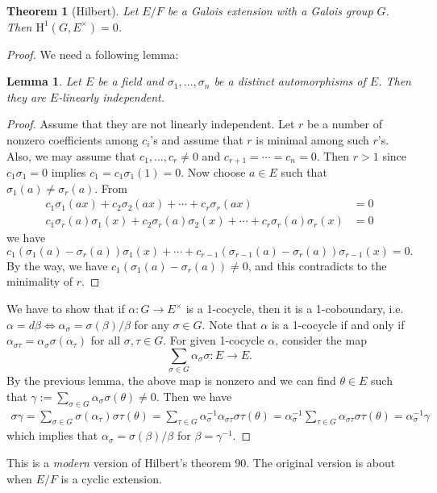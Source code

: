 \documentclass{article}
\newtheorem{theorem}{Theorem}
\newtheorem{lemma}{Lemma}
\newcommand{\rH}{\mathrm{H}}
\begin{document}
\begin{theorem}[Hilbert]
Let $E/F$ be a Galois extension with a Galois group $G$. Then $\rH^{1}(G,E^{\times})=0$. 
\end{theorem}
\begin{proof}We need a following lemma:
\begin{lemma}
Let $E$ be a field and $\sigma_{1}, \dots, \sigma_{n}$ be a distinct automorphisms of $E$. Then they are $E$-linearly independent. 
\end{lemma}
\begin{proof}
Assume that they are not linearly independent. Let $r$ be a number of nonzero coefficients among $c_{i}$'s and assume that $r$ is minimal among such $r$'s. Also, we may assume that  $c_{1}, \dots, c_{r}\neq 0$ and $c_{r+1} = \cdots = c_{n} = 0$. 
Then $r>1$ since $c_{1}\sigma_{1} = 0$ implies $c_{1} = c_{1}\sigma_{1}(1) = 0$. 
Now choose $a\in E$ such that $\sigma_{1}(a)\neq \sigma_{r}(a)$. From
\begin{align*}
c_{1}\sigma_{1}(ax)+c_{2}\sigma_{2}(ax) + \cdots + c_{r}\sigma_{r}(ax) &= 0 \\
c_{1}\sigma_{r}(a)\sigma_{1}(x) + c_{2}\sigma_{r}(a)\sigma_{2}(x) + \cdots + c_{r}\sigma_{r}(a)\sigma_{r}(x) &= 0
\end{align*}
we have
$$
c_{1}(\sigma_{1}(a) - \sigma_{r}(a))\sigma_{1}(x) + \cdots + c_{r-1}(\sigma_{r-1}(a) - \sigma_{r}(a))\sigma_{r-1}(x) = 0.
$$
By the way, we have $c_{1}(\sigma_{1}(a) - \sigma_{r}(a))\neq 0$, and this contradicts to the minimality of $r$. 
\end{proof}
We have to show that if $\alpha:G\to E^{\times}$ is a 1-cocycle, then it is a 1-coboundary, i.e. $\alpha = d\beta \Leftrightarrow \alpha_{\sigma} = \sigma(\beta)/\beta$ for any $\sigma\in G$. 
Note that $\alpha$ is a 1-cocycle if and only if $\alpha_{\sigma\tau} = \alpha_{\sigma}\sigma(\alpha_{\tau})$ for all $\sigma, \tau\in G$. 
For given 1-cocycle $\alpha$, consider the map 
$$
\sum_{\sigma\in G} \alpha_{\sigma} \sigma:E\to E. 
$$
By the previous lemma, the above map is nonzero and we can find $\theta\in E$ such that $\gamma:= \sum_{\sigma\in G}\alpha_{\sigma}\sigma(\theta)\neq 0$. 
Then we have
\begin{align*}
\sigma\gamma  = \sum_{\sigma\in G}\sigma(\alpha_{\tau}) \sigma\tau(\theta) 
= \sum_{\tau\in G}\alpha_{\sigma}^{-1}\alpha_{\sigma\tau}\sigma\tau(\theta) 
= \alpha_{\sigma}^{-1}\sum_{\tau\in G} \alpha_{\sigma\tau}\sigma\tau(\theta) 
= \alpha_{\sigma}^{-1}\gamma
\end{align*}
which implies that $\alpha_{\sigma} = \sigma(\beta)/\beta$ for $\beta = \gamma^{-1}$. 
\end{proof}
This is a \emph{modern} version of Hilbert's theorem 90. The original version is about when $E/F$ is a cyclic extension. 
\end{document}
